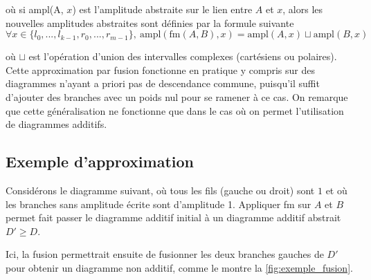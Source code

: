 \noindent où si ampl(A, $x$) est l'amplitude abstraite sur le lien entre $A$ et $x$, alors les nouvelles amplitudes abstraites sont définies par la formule suivante
$$\forall x \in \{l_0, ..., l_{k-1}, r_0, ..., r_{m-1}\},~\text{ampl}(\text{fm}(A, B), x) = \text{ampl}(A, x) \sqcup \text{ampl}(B, x)$$

\noindent où $\sqcup$ est l'opération d'union des intervalles complexes (cartésiens ou polaires). Cette approximation par fusion fonctionne en pratique y compris sur des diagrammes n'ayant a priori pas de descendance commune, puisqu'il suffit d'ajouter des branches avec un poids nul pour se ramener à ce cas. On remarque que cette généralisation ne fonctionne que dans le cas où on permet l'utilisation de diagrammes additifs.

\begin{multicols}{2}
  \section{Exemple d'approximation}
  Considérons le diagramme suivant, où tous les fils (gauche ou droit) sont $\boxed 1$ et où les branches sans amplitude écrite sont d'amplitude 1. Appliquer fm sur $A$ et $B$ permet fait passer le diagramme additif initial à un diagramme additif abstrait $D' \ge D$.

  Ici, la fusion permettrait ensuite de fusionner les deux branches gauches de $D'$ pour obtenir un diagramme non additif, comme le montre la \autoref{fig:exemple_fusion}.


\end{multicols}
